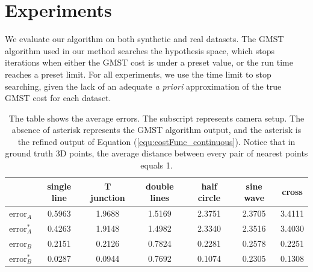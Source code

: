 
\section{Experiments}
We evaluate our algorithm on both synthetic and real datasets.
The GMST algorithm used in our method \cite{Ferreira_ESWA2012} searches the hypothesis space, which stops iterations when either the GMST cost is under a preset value, or the run time reaches a preset limit. For all experiments, we use the time limit to stop searching, given the lack of an adequate {\em a priori} approximation of the true  GMST cost for each dataset.
\begin{table}
\centering
\begin{tabular}{|c|c|c|c|c|c|c|}  \hline
               & single line & T junction & double lines & half circle & sine wave & cross \\
  \hline
  $\text{error}_A$ & 0.5963 & 1.9688 & 1.5169 & 2.3751  & 2.3705 & 3.4111\\
  \hline
  $\text{error}^*_A$ & 0.4263 & 1.9148 & 1.4982 & 2.3340  & 2.3516 & 3.4030 \\
  \hline
  $\text{error}_B$ & 0.2151 & 0.2126 & 0.7824 & 0.2281& 0.2578 &0.2251 \\
  \hline
  $\text{error}^*_B$ & 0.0287 & 0.0944 & 0.7692 & 0.1074 & 0.2305 & 0.1308\\
  \hline
\end{tabular}
\caption{ The table shows the average errors. The subscript represents camera setup. The absence of asterisk represents the GMST algorithm output, and the asterisk is the refined output of Equation (\ref{equ:costFunc_continuous}). Notice that in ground truth 3D points, the average distance between every pair of nearest points  equals 1. }
\label{fig:syntheticDataResult}
\end{table}

